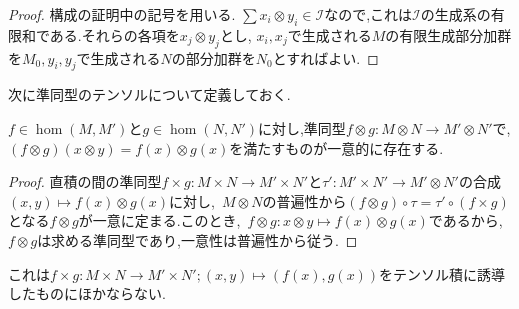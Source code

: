 \begin{proof}
	構成の証明中の記号を用いる. $\sum x_i\otimes y_i\in\mathcal{I}$なので,これは$\mathcal{I}$の生成系の有限和である.それらの各項を$x_j\otimes y_j$とし, $x_i,x_j$で生成される$M$の有限生成部分加群を$M_0, y_i,y_j$で生成される$N$の部分加群を$N_0$とすればよい.
\end{proof}

次に準同型のテンソルについて定義しておく.

\begin{prop}
	$f\in\hom(M,M')$と$g\in\hom(N,N')$に対し,準同型$f\otimes g:M\otimes N\to M'\otimes N'$で, $(f\otimes g)(x\otimes y)=f(x)\otimes g(x)$を満たすものが一意的に存在する.
\end{prop}
\begin{proof}
	直積の間の準同型$f\times g:M\times N\to M'\times N'$と$\tau':M'\times N'\to M'\otimes N'$の合成$(x,y)\mapsto f(x)\otimes g(x)$に対し,~$M\otimes N$の普遍性から$(f\otimes g)\circ\tau=\tau'\circ(f\times g)$となる$f\otimes g$が一意に定まる.このとき,~$f\otimes g:x\otimes y\mapsto f(x)\otimes g(x)$であるから,~$f\otimes g$は求める準同型であり,一意性は普遍性から従う.
\end{proof}
これは$f\times g:M\times N\to M'\times N';(x,y)\mapsto (f(x),g(x))$をテンソル積に誘導したものにほかならない.


